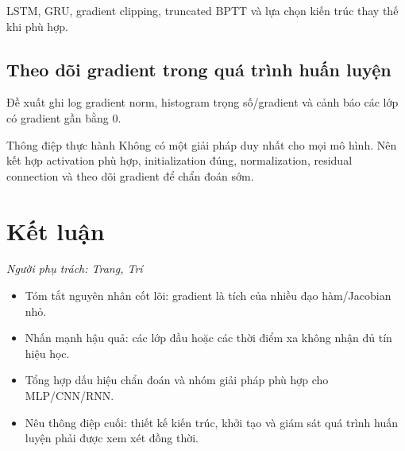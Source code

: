 \documentclass[12pt]{article}
\begin{document}
LSTM, GRU, gradient clipping, truncated BPTT và lựa chọn kiến trúc thay thế khi phù hợp.

\subsection{Theo dõi gradient trong quá trình huấn luyện}
Đề xuất ghi log gradient norm, histogram trọng số/gradient và cảnh báo các lớp có gradient gần bằng $0$.

\begin{guidelinebox}{Thông điệp thực hành}
Không có một giải pháp duy nhất cho mọi mô hình. Nên kết hợp activation phù hợp, initialization đúng, normalization, residual connection và theo dõi gradient để chẩn đoán sớm.
\end{guidelinebox}

\section{Kết luận}
\textit{Người phụ trách: Trang, Trí}

\begin{itemize}
    \item Tóm tắt nguyên nhân cốt lõi: gradient là tích của nhiều đạo hàm/Jacobian nhỏ.
    \item Nhấn mạnh hậu quả: các lớp đầu hoặc các thời điểm xa không nhận đủ tín hiệu học.
    \item Tổng hợp dấu hiệu chẩn đoán và nhóm giải pháp phù hợp cho MLP/CNN/RNN.
    \item Nêu thông điệp cuối: thiết kế kiến trúc, khởi tạo và giám sát quá trình huấn luyện phải được xem xét đồng thời.
\end{itemize}
\end{document}
